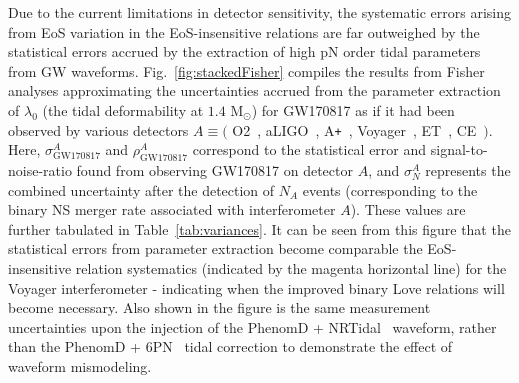 \documentclass[prd,twocolumn,nofootinbib,superscriptaddress,amsmath,amssymb]{revtex4-1}
\begin{document}
Due to the current limitations in detector sensitivity, the systematic errors arising from EoS variation in the EoS-insensitive relations are far outweighed by the statistical errors accrued by the extraction of high pN order tidal parameters from GW waveforms.
Fig.~\ref{fig:stackedFisher} compiles the results from Fisher analyses approximating the uncertainties accrued from the parameter extraction of $\lambda_0$ (the tidal deformability at $1.4 \text{ M}_{\odot}$) for GW170817 as if it had been observed by various detectors $A \equiv ($ O2~\cite{aLIGO}, aLIGO~\cite{aLIGO}, A\texttt{+}~\cite{Ap_Voyager_CE}, Voyager~\cite{Ap_Voyager_CE}, ET~\cite{ET}, CE~\cite{Ap_Voyager_CE}$)$.
Here, $\sigma^A_{\text{GW170817}}$ and $\rho^A_{\text{GW170817}}$ correspond to the statistical error and signal-to-noise-ratio found from observing GW170817 on detector $A$, and $\sigma^A_N$ represents the combined uncertainty after the detection of $N_A$ events (corresponding to the binary NS merger rate associated with interferometer $A$).
These values are further tabulated in Table~\ref{tab:variances}.
It can be seen from this figure that the statistical errors from parameter extraction become comparable the EoS-insensitive relation systematics (indicated by the magenta horizontal line) for the Voyager interferometer - indicating when the improved binary Love relations will become necessary.
Also shown in the figure is the same measurement uncertainties upon the injection of the PhenomD + NRTidal~\cite{PhenomDI,PhenomDII,Samajdar:NRTidal} waveform, rather than the PhenomD + 6PN~\cite{PhenomDI,PhenomDII,Wade:tidalCorrections} tidal correction to demonstrate the effect of waveform mismodeling.
\end{document}

